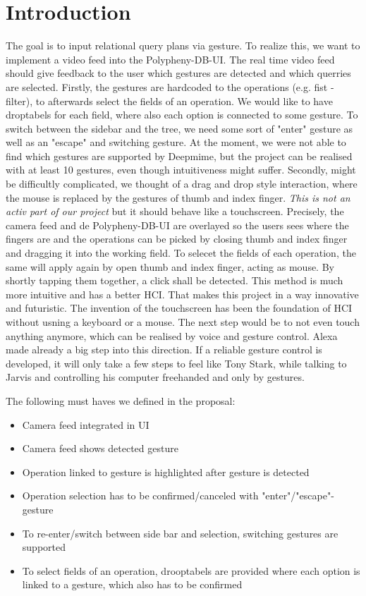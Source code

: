 \section{Introduction}
\label{g1:sec:introduction}  %

The goal is to input relational query plans via gesture. To realize this, we want to implement a video feed into the Polypheny-DB-UI. The real time video feed should give feedback to the user which gestures are detected and which querries are selected. Firstly, the gestures are hardcoded to the operations (e.g. fist - filter), to afterwards select the fields of an operation. We would like to have droptabels for each field, where also each option is connected to some gesture. To switch between the sidebar and the tree, we need some sort of "enter" gesture as well as an "escape" and switching gesture. At the moment, we were not able to find which gestures are supported by Deepmime, but the project can be realised with at least 10 gestures, even though intuitiveness might suffer.
\newline
Secondly, might be difficultly complicated, we thought of a drag and drop style interaction, where the mouse is replaced by the gestures of thumb and index finger. \textit{This is not an activ part of our project} but it should behave like a touchscreen. Precisely, the camera feed and de Polypheny-DB-UI are overlayed so the users sees where the fingers are and the operations can be picked by closing thumb and index finger and dragging it into the working field.
To selecet the fields of each operation, the same will apply again by open thumb and index finger, acting as mouse. By shortly tapping them together, a click shall be detected.
This method is much more intuitive and has a better HCI.
\newline
That makes this project in a way innovative and futuristic. The invention of the touchscreen has been the foundation of HCI without usning a keyboard or a mouse. The next step would be to not even touch anything anymore, which can be realised by voice and gesture control. Alexa made already a big step into this direction. If a reliable gesture control is developed, it will only take a few steps to feel like Tony Stark, while talking to Jarvis and controlling his computer freehanded and only by gestures.

The following must haves we defined in the proposal:
\begin{itemize}
    \item Camera feed integrated in UI
    \item Camera feed shows detected gesture
    \item Operation linked to gesture is highlighted after gesture is detected
    \item Operation selection has to be confirmed/canceled with "enter"/"escape"-gesture
    \item To re-enter/switch between side bar and selection, switching gestures are supported
    \item To select fields of an operation, drooptabels are provided where each option is linked to a gesture, which also has to be confirmed
    
\end{itemize}